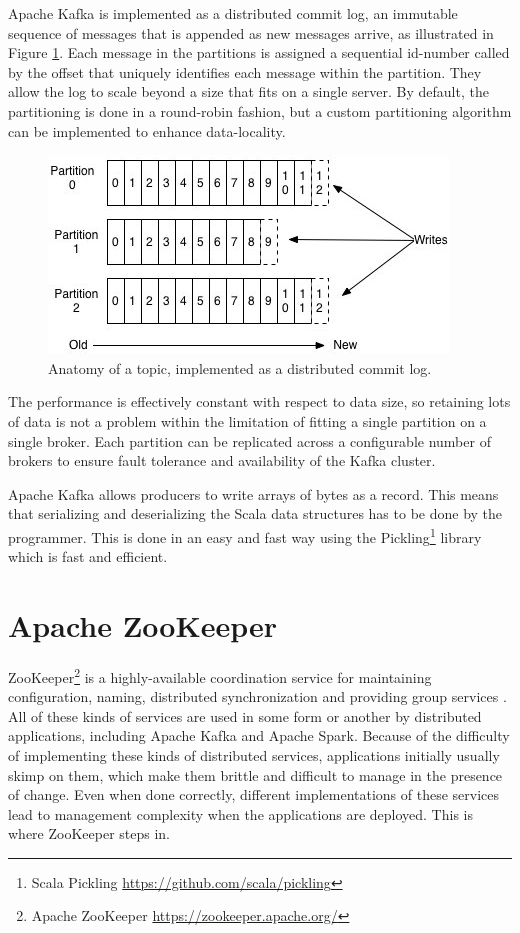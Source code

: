 Apache Kafka is implemented as a distributed commit log, an immutable sequence of messages that is appended as new messages arrive, as illustrated in Figure \ref{fig:kafkalog}. Each message in the partitions is assigned a sequential id-number called by the offset that uniquely identifies each message within the partition. They allow the log to scale beyond a size that fits on a single server. By default, the partitioning is done in a round-robin fashion, but a custom partitioning algorithm can be implemented to enhance data-locality. 

\begin{figure}[ht!]
\centering
\includegraphics[width=.9\textwidth]{figures/kafkalog.jpg}
\caption{Anatomy of a topic, implemented as a distributed commit log\label{fig:kafkalog}.}
\end{figure}

The performance is effectively constant with respect to data size, so retaining lots of data is not a problem within the limitation of fitting a single partition on a single broker. Each partition can be replicated across a configurable number of brokers to ensure fault tolerance and availability of the Kafka cluster. 

Apache Kafka allows producers to write arrays of bytes as a record. This means that serializing and deserializing the Scala data structures has to be done by the programmer. This is done in an easy and fast way using the Pickling\footnote{Scala Pickling \url{https://github.com/scala/pickling}} library which is fast and efficient. 

\section{Apache ZooKeeper \label{subsec_ZooKeeper}}

ZooKeeper\footnote{Apache ZooKeeper \url{https://zookeeper.apache.org/}} is a highly-available coordination service for maintaining configuration, naming, distributed synchronization and providing group services \cite{Hunt:2010}. All of these kinds of services are used in some form or another by distributed applications, including Apache Kafka and Apache Spark. Because of the difficulty of implementing these kinds of distributed services, applications initially usually skimp on them, which make them brittle and difficult to manage in the presence of change. Even when done correctly, different implementations of these services lead to management complexity when the applications are deployed. This is where ZooKeeper steps in.

